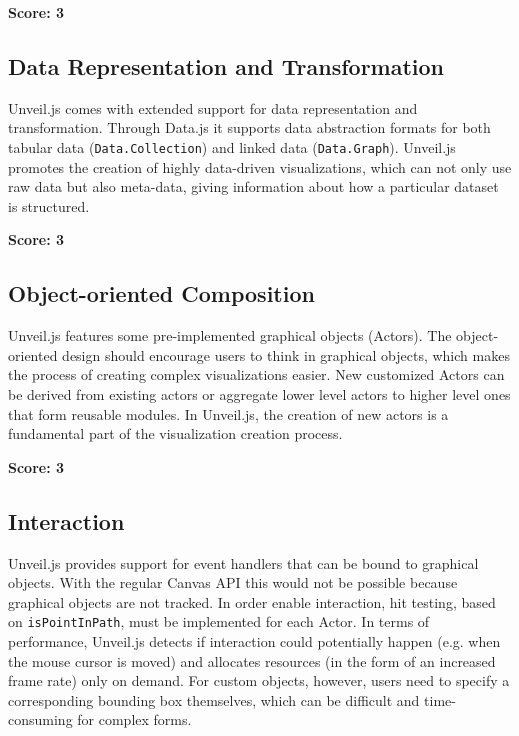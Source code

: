 \SuperPar \textbf{Score: 3}

\subsection{Data Representation and Transformation}

Unveil.js comes with extended support for data representation and transformation. Through Data.js it supports data abstraction formats for both tabular data (\texttt{Data.Collection}) and linked data (\texttt{Data.Graph}). Unveil.js promotes the creation of highly data-driven visualizations, which can not only use raw data but also meta-data, giving information about how a particular dataset is structured.

\SuperPar \textbf{Score: 3}

\subsection{Object-oriented Composition}

Unveil.js features some pre-implemented graphical objects (Actors). The object-oriented design should encourage users to think in graphical objects, which makes the process of creating complex visualizations easier. New customized Actors can be derived from existing actors or aggregate lower level actors to higher level ones that form reusable modules. In Unveil.js, the creation of new actors is a fundamental part of the visualization creation process.

\SuperPar \textbf{Score: 3}

\subsection{Interaction}

Unveil.js provides support for event handlers that can be bound to graphical objects. With the regular Canvas API this would not be possible because graphical objects are not tracked. In order enable interaction, hit testing, based on \texttt{isPointInPath}, must be implemented for each Actor. In terms of performance, Unveil.js detects if interaction could potentially happen (e.g. when the mouse cursor is moved) and allocates resources (in the form of an increased frame rate) only on demand. For custom objects, however, users need to specify a corresponding bounding box themselves, which can be difficult and time-consuming for complex forms.

